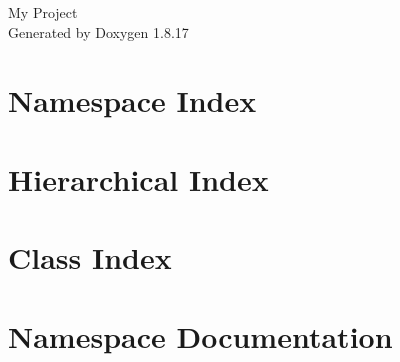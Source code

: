 \let\mypdfximage\pdfximage\def\pdfximage{\immediate\mypdfximage}\documentclass[twoside]{book}
\newcommand{\+}{\discretionary{\mbox{\scriptsize$\hookleftarrow$}}{}{}}
\newcommand{\clearemptydoublepage}{%
  \newpage{\pagestyle{empty}\cleardoublepage}%
}
\begin{document}
\hypersetup{pageanchor=false,
             bookmarksnumbered=true,
             pdfencoding=unicode
            }
\begin{titlepage}
\vspace*{7cm}
\begin{center}%
{\Large My Project }\\
\vspace*{1cm}
{\large Generated by Doxygen 1.8.17}\\
\end{center}
\end{titlepage}
\clearemptydoublepage
{}
\tableofcontents
\clearemptydoublepage
{}
\hypersetup{pageanchor=true}

\chapter{Namespace Index}

\chapter{Hierarchical Index}

\chapter{Class Index}

\chapter{Namespace Documentation}

\end{document}
